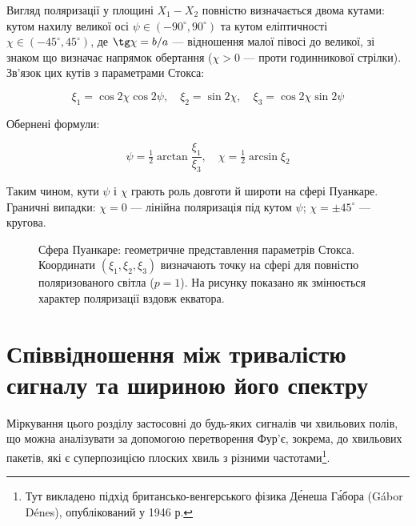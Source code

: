 Вигляд поляризації у площині \(X_1\!-\!X_2\) повністю визначається двома кутами: кутом нахилу великої осі \(\psi \in
(-90^{\circ}, 90^{\circ})\) та кутом еліптичності \(\chi \in (-45^{\circ}, 45^{\circ})\), де \(\tg\chi = b/a\) ---
відношення малої півосі до великої, зі знаком що визначає напрямок обертання (\(\chi > 0\) --- проти годинникової
стрілки). Зв'язок цих кутів з параметрами Стокса:

\begin{equation*}
	\xi_1 = \cos 2\chi \cos 2\psi, \quad
	\xi_2 = \sin 2\chi, \quad
	\xi_3 = \cos 2\chi \sin 2\psi
\end{equation*}

Обернені формули:

\begin{equation*}
	\psi = \tfrac{1}{2}\arctan\frac{\xi_1}{\xi_3}, \quad
	\chi = \tfrac{1}{2}\arcsin\xi_2
\end{equation*}

Таким чином, кути \(\psi\) і \(\chi\) грають роль довготи й широти на сфері Пуанкаре. Граничні випадки: \(\chi = 0\) ---
лінійна поляризація під кутом \(\psi\); \(\chi = \pm 45^{\circ}\) --- кругова.

\begin{figure}[ht!]\centering
	\caption{Сфера Пуанкаре: геометричне представлення параметрів Стокса. Координати \((\xi_1, \xi_2, \xi_3)\)
		визначають точку на сфері для повністю поляризованого світла (\(p=1\)). На рисунку показано як змінюється
		характер поляризації вздовж екватора.}%
	\label{pic:Stoke}
\end{figure}

\section{Співвідношення між тривалістю сигналу та шириною його спектру}\label{sec:signal_spectrum}

Міркування цього розділу застосовні до будь-яких сигналів чи хвильових полів, що можна аналізувати за допомогою
перетворення Фур'є, зокрема, до хвильових пакетів, які є суперпозицією плоских хвиль з різними
частотами\footnote{Тут викладено підхід британсько-венгерського фізика Де́неша Га́бора (Gábor Dénes), опублікований у 1946 р.}.

